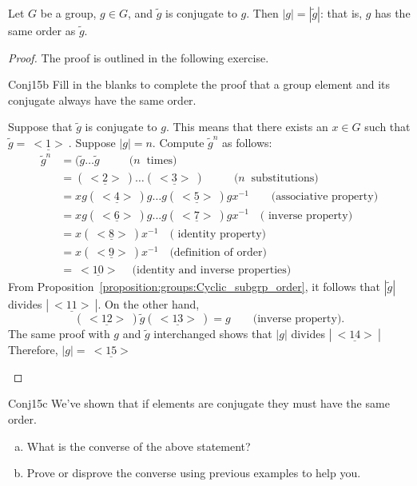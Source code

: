 \begin{prop}{} Let $G$ be a group, $g \in G$, and $\tilde{g}$ is conjugate to $g$. Then $|g| = |\tilde{g}|$: that is,  $g$ has the same order as $\tilde{g}$.
\end{prop}

\begin{proof}  The proof is outlined in the following exercise.

\begin{exercise}{Conj15b}
Fill in the blanks to complete the proof that a group element and its conjugate always have the same order.

Suppose that $\tilde{g}$ is conjugate to $g$. This means that there exists an $x\in G$ such that $\tilde{g}=\underline{~<1>~}$. Suppose $|g|=n$. Compute $\tilde{g}^n$ as follows:
\begin{align*}
 \tilde{g}^n&=(\tilde{g} \ldots \tilde{g}~~~~~~~~~~~~(n~\text{ times)}\\ 
&=(\underline{~<2>~}) \ldots (\underline{~<3>~})~~~~~~~~~~~~(n~\text{ substitutions)}\\ 
& =xg(\underline{~<4>~})g \ldots g(\underline{~<5>~})gx^{-1}\qquad\text{(associative property)}\\
&=xg(\underline{~<6>~})g...g(\underline{~<7>~})gx^{-1}\quad\text{( inverse property)}\\
&=x(\underline{~<8>~})x^{-1}\quad\text{( identity property)}\\
&=x(\underline{~<9>~})x^{-1}\quad\text{(definition of order)}\\
&=\underline{~<10>~}\quad\text{(identity and inverse properties)}
\end{align*}
\noindent
From Proposition~\ref{proposition:groups:Cyclic_subgrp_order}, it follows that  $| \tilde{g}|$ divides $|\underline{~<11>~}|$. On the other hand, \[(\underline{~<12>~})\tilde{g}(\underline{~<13>~})=g\qquad\text{(inverse property)}.\]  
The same proof  with $g$ and $\tilde{g}$ interchanged shows that $|g|$ divides $|\underline{~<14>~}|$ Therefore,  $|g|=\underline{~<15>~}$ 
\end {exercise}
\end{proof}

\begin{exercise}{Conj15c}
We've shown that if elements are conjugate they must have the same order.
\begin{enumerate}[(a)]
\item What is the converse of the above statement?
\item Prove or disprove the converse using previous examples to help you.
\end{enumerate}
\end {exercise}
 
